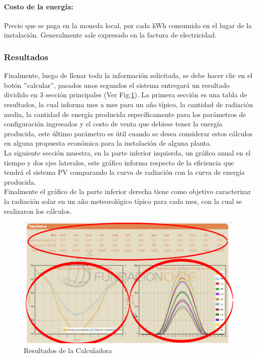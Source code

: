 \paragraph{Costo de la energía:} Precio que se paga en la moneda local, por cada kWh consumido en el lugar de la instalación.
Generalmente sale expresado en la factura de electricidad.

\subsubsection{Resultados}
Finalmente, luego de llenar toda la información solicitada, se debe hacer clic en el botón ''calcular'', pasados unos segundos el sistema entregará un resultado dividido en 3 sección principales (Ver Fig:\ref{resultadosCalc}). La primera sección es una tabla de resultados, la cual informa mes a mes para un año típico, la cantidad de radiación media, la cantidad de energía producida específicamente para los parámetros de configuración ingresados y el costo de venta que debiese tener la energía producida, este último parámetro es útil cuando se desea considerar estos cálculos en alguna propuesta económica para la instalación de alguna planta.\\ La siguiente sección muestra, en la parte inferior izquierda, un gráfico anual en el tiempo y dos ejes laterales, este gráfico informa respecto de la eficiencia que tendrá el sistema PV comparando la curva de radiación con la curva de energía producida.\\ Finalmente el gráfico de la parte inferior derecha tiene como objetivo caracterizar la radiación solar en un año meteorológico típico para cada mes, con la cual se realizaron los cálculos.

\begin{figure}[h]
        \centering
        \includegraphics[scale=0.4]{./images/cap5chap1img9}
        \caption{Resultados de la Calculadora}
        \label{resultadosCalc}
\end{figure}

